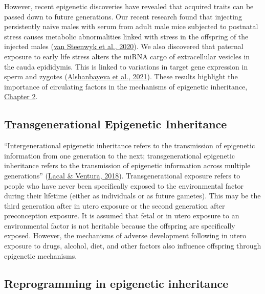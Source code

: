 \documentclass[12pt,twoside]{reedthesis}
\begin{document}
However, recent epigenetic discoveries have revealed that acquired
traits can be passed down to future generations. Our recent research
found that injecting persistently naive males with serum from adult male
mice subjected to postnatal stress causes metabolic abnormalities linked
with stress in the offspring of the injected males (\protect\hyperlink{ref-vansteenwyk2020}{van Steenwyk et al., 2020}).
We also discovered that paternal exposure to early life stress alters
the miRNA cargo of extracellular vesicles in the cauda epididymis. This
is linked to variations in target gene expression in sperm and zygotes
(\protect\hyperlink{ref-alshanbayeva2021}{Alshanbayeva et al., 2021}). These results highlight the importance of
circulating factors in the mechanisms of epigenetic inheritance,
\protect\hyperlink{chapter2}{Chapter 2}.

\hypertarget{tei}{%
\subsection*{Transgenerational Epigenetic Inheritance}\label{tei}}

``Intergenerational epigenetic inheritance refers to the transmission of
epigenetic information from one generation to the next;
transgenerational epigenetic inheritance refers to the transmission of
epigenetic information across multiple generations'' (\protect\hyperlink{ref-lacal2018}{Lacal \& Ventura, 2018}).
Transgenerational exposure refers to people who have never been
specifically exposed to the environmental factor during their lifetime
(either as individuals or as future gametes). This may be the third
generation after in utero exposure or the second generation after
preconception exposure. It is assumed that fetal or in utero exposure to
an environmental factor is not heritable because the offspring are
specifically exposed. However, the mechanisms of adverse development
following in utero exposure to drugs, alcohol, diet, and other factors
also influence offspring through epigenetic mechanisms.

\hypertarget{reprogramming-in-epigenetic-inheritance}{%
\subsection*{Reprogramming in epigenetic inheritance}\label{reprogramming-in-epigenetic-inheritance}}
\end{document}
